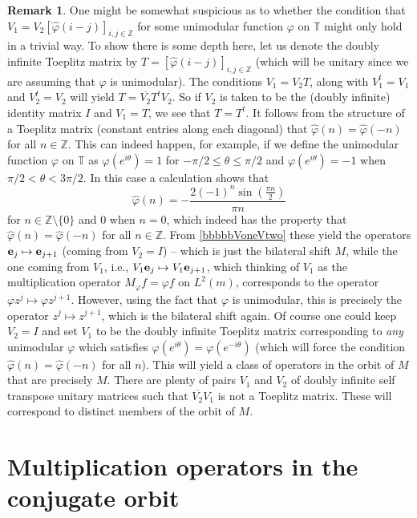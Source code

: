\documentclass{dis}
\theoremstyle{plain}
\theoremstyle{definition}
\newtheorem{Remark}[equation]{Remark}
\def\T{\mathbb{T}}
\def\Z{\mathbb{Z}}
\renewcommand{\leq}{\leqslant}
\renewcommand{\phi}{\varphi}
\renewcommand{\vec}[1]{{\bf #1}}
\newcommand{\0}{{\color{lightgray}0}}
\begin{document}
\begin{Remark}\label{QPLAKSJFHG}
One might be somewhat suspicious as to whether the condition that $V_{1} = V_{2} [\widehat{\phi}(i - j)]_{i, j \in \Z}$ for some unimodular function $\phi$ on $\T$ might only hold in a trivial way. To show there is some depth here, let us denote the doubly infinite Toeplitz matrix by  $T = [\widehat{\phi}(i - j)]_{i, j \in \Z}$ (which will be unitary since we are assuming that $\phi$ is unimodular). The conditions $V_1 =  V_2 T$, along with  $V_{1}^{t} = V_{1}$ and $V_{2}^{t} = V_{2}$ will yield $T = \overline{V_2} T^{t}   V_{2}$. So if $V_{2}$ is taken to be the (doubly infinite)  identity matrix $I$ and $V_{1} = T$, we see that $T = T^{t}$. It follows from the structure of a Toeplitz matrix  (constant entries along each diagonal) that $\widehat{\phi}(n) = \widehat{\phi}(-n)$ for all $n \in \Z$. This can indeed happen, for example,  if we define the unimodular function $\phi$ on $\T$ as  $\phi(e^{i \theta}) = 1$ for $-\pi/2 \leq \theta \leq \pi/2$ and $\phi(e^{i \theta})= -1$ when $\pi/2 < \theta < 3 \pi/2$. In this case a calculation shows that 
$$\widehat{\phi}(n)  = -\frac{2 (-1)^n \sin \left(\frac{\pi  n}{2}\right)}{\pi  n}$$
for $n \in \Z \setminus \{0\}$ and $0$ when $n = 0$, 
which indeed has the property that $\widehat{\phi}(n) = \widehat{\phi}(-n)$ for all $n \in \Z$. From \eqref{bbbbbVoneVtwo} these yield the operators 
$\vec{e}_{j} \mapsto \vec{e}_{j + 1}$ (coming from $V_2 = I$) -- which is just the bilateral shift $M$, while the one coming from $V_1$, i.e., $V_{1} \vec{e}_{j} \mapsto V_{1} \vec{e}_{j + 1}$, which thinking of $V_{1}$ as the multiplication operator $M_{\phi} f= \phi f$ on $L^2(m)$, corresponds to the operator $\phi z^j \mapsto \phi z^{j + 1}$. However, using the fact that $\phi$ is unimodular, this is precisely the operator $z^{j} \mapsto z^{j + 1}$, which is the bilateral shift again. Of course one could keep $V_2 = I$ and set $V_1$ to be the doubly infinite Toeplitz matrix corresponding to {\em any} unimodular $\phi$ which satisfies $\phi(e^{i \theta}) = \phi(e^{-i \theta})$ (which will force the condition $\widehat{\phi}(n) = \widehat{\phi}(-n)$ for all $n$). This will yield a class of operators in the orbit of $M$ that are precisely $M$. There are plenty of pairs $V_1$ and $V_2$ of doubly infinite self transpose unitary matrices such that $\overline{V_2} V_1$ is not a Toeplitz matrix. These will correspond to distinct members of the orbit of $M$. 
\end{Remark}

\section{Multiplication operators in the conjugate orbit}
\end{document}
